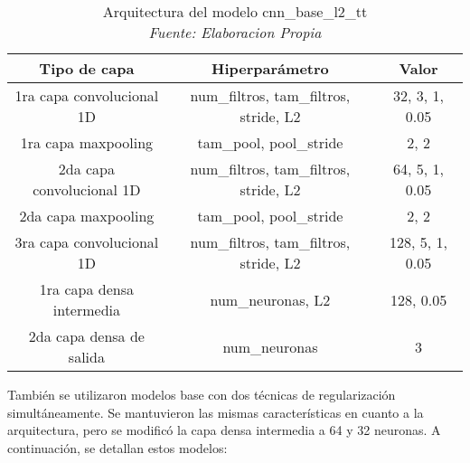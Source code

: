 \begin{itemize}
	\begin{table}[!ht]
		\centering
		\begin{tabular}{|c|c|c|}
			\hline
			\textbf{Tipo de capa} & \textbf{Hiperparámetro} & \textbf{Valor} \\ \hline
			1ra capa convolucional 1D & num\_filtros, tam\_filtros, stride, L2 & 32, 3, 1, 0.05 \\ \hline
			1ra capa maxpooling & tam\_pool, pool\_stride & 2, 2 \\ \hline
			2da capa convolucional 1D & num\_filtros, tam\_filtros, stride, L2 & 64, 5, 1, 0.05 \\ \hline
			2da capa maxpooling & tam\_pool, pool\_stride & 2, 2 \\ \hline
			3ra capa convolucional 1D & num\_filtros, tam\_filtros, stride, L2 & 128, 5, 1, 0.05 \\ \hline
			1ra capa densa intermedia & num\_neuronas, L2 & 128, 0.05 \\ \hline
			2da capa densa de salida & num\_neuronas & 3 \\ \hline
		\end{tabular}
		\caption[Arquitectura del modelo cnn\_base\_l2\_tt]{Arquitectura del modelo cnn\_base\_l2\_tt
			\\\textit{Fuente: Elaboracion Propia}}
		\label{tbl:cnn_base_l2_tt}
	\end{table}
	
	
\end{itemize}

También se utilizaron modelos base con dos técnicas de regularización simultáneamente. Se mantuvieron las mismas características en cuanto a la arquitectura, pero se modificó la capa densa intermedia a 64 y 32 neuronas. A continuación, se detallan estos modelos:

